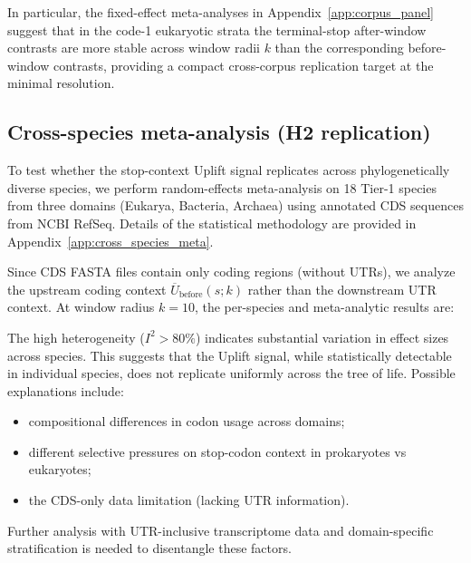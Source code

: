 In particular, the fixed-effect meta-analyses in Appendix~\ref{app:corpus_panel} suggest that in the code-1 eukaryotic strata the terminal-stop after-window contrasts are more stable across window radii $k$ than the corresponding before-window contrasts, providing a compact cross-corpus replication target at the minimal resolution.

\subsection{Cross-species meta-analysis (H2 replication)}
\label{sec:cross_species_meta}

To test whether the stop-context Uplift signal replicates across phylogenetically diverse species, we perform random-effects meta-analysis on 18 Tier-1 species from three domains (Eukarya, Bacteria, Archaea) using annotated CDS sequences from NCBI RefSeq.
Details of the statistical methodology are provided in Appendix~\ref{app:cross_species_meta}.

Since CDS FASTA files contain only coding regions (without UTRs), we analyze the upstream coding context $\overline{U}_{\mathrm{before}}(s;k)$ rather than the downstream UTR context.
At window radius $k=10$, the per-species and meta-analytic results are:


The high heterogeneity ($I^2 > 80\%$) indicates substantial variation in effect sizes across species.
This suggests that the Uplift signal, while statistically detectable in individual species, does not replicate uniformly across the tree of life.
Possible explanations include:
\begin{itemize}
\item compositional differences in codon usage across domains;
\item different selective pressures on stop-codon context in prokaryotes vs eukaryotes;
\item the CDS-only data limitation (lacking UTR information).
\end{itemize}
Further analysis with UTR-inclusive transcriptome data and domain-specific stratification is needed to disentangle these factors.

